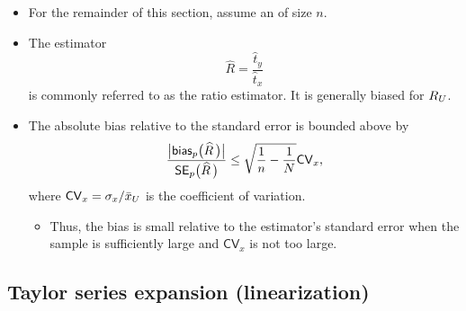 \documentclass{my_eth_beamer}
\numberwithin{equation}{section}
\begin{document}
\begin{frame}
    \begin{itemize}
    \setlength{\itemsep}{10pt}
        \item For the remainder of this section, assume an \SRS of size $n$.
        \item The estimator
            \begin{equation*}
            \widehat R = \frac{\widehat t_y}{\widehat t_x}
            \end{equation*}
            is commonly referred to as the \alert{ratio estimator}. It is
            generally \alert{biased} for $R_U$.
        \item The \alert{absolute bias relative to the standard error} is
            bounded above by \citep{hartley_ross_1954}
            \begin{equation*}
                \frac{\big\vert \bias\big(\rats\,\big) \big\vert}{%
                    \se\big(\rats\,\big)} \leq
                    \sqrt{\frac{1}{n} - \frac{1}{N}} \mathsf{CV}_x,
            \end{equation*}
            where $\mathsf{CV}_x = \sigma_x / \bar{x}_U$ is the coefficient of
            variation.
            \vspace{0.25em}
            \begin{itemize}
            \setlength{\itemsep}{10pt}
                \item[\goto] Thus, the bias is small relative to the
                    estimator's standard error when the sample is sufficiently
                    large and $\mathsf{CV}_x$ is not too large.
            \end{itemize}
    \end{itemize}
\end{frame}

\subsection{Taylor series expansion (linearization)}
\end{document}
